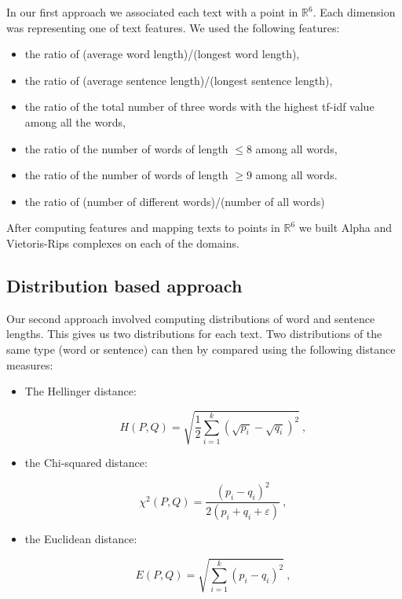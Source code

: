 \documentclass[12pt,a4paper]{amsart}
\def\R{\mathbb R}
\begin{document}
In our first approach we associated each text with a point in $\R ^6$. Each dimension was representing one of text features. We used the following features:
\begin{itemize}
  \setlength\itemsep{0.5em}
  \item the ratio of (average word length)/(longest word length),
  \item the ratio of (average sentence length)/(longest sentence length),
  \item the ratio of the total number of three words with the highest tf-idf
    value among all the words,
  \item the ratio of the number of words of length $\le 8$ among all words,
  \item the ratio of the number of words of length $\ge 9$ among all words.
  \item the ratio of (number of different words)/(number of all words)
\end{itemize}

After computing features and mapping texts to points in $\R ^6$ we
built Alpha and Vietoris-Rips complexes on each of the domains.

\subsection{Distribution based approach}

Our second approach involved computing distributions of word and sentence
lengths. This gives us two distributions for each text. Two distributions of the same type (word or sentence) can then by compared using the following distance measures:

\begin{itemize}
\item The Hellinger distance:

\begin{equation*}
  H(P,Q) = \sqrt{\frac{1}{2} \sum_{i=1}^k\left(\sqrt{p_i} -
    \sqrt{q_i}\right)^2}\ ,
\end{equation*}

\item the Chi-squared distance:

\begin{equation*}
  \chi^2(P,Q) = \frac{(p_i - q_i)^2}{2(p_i + q_i + \varepsilon)}\ ,
\end{equation*}

\item the Euclidean distance:

\begin{equation*}
  E(P,Q) = \sqrt{\sum_{i=1}^k\left(p_i - q_i\right)^2}\ ,
\end{equation*}
\end{itemize}
\end{document}
